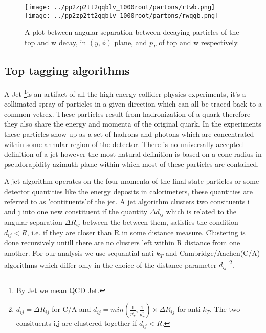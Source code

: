 \documentclass[12pt,a4paper]{article}		%
\begin{document}
\newpage
 	\begin{figure}[h]
 		\begin{centering}	
 			\texttt{[image: ../pp2zp2tt2qqblv\_1000root/partons/rtwb.png]} 
 			\texttt{[image: ../pp2zp2tt2qqblv\_1000root/partons/rwqqb.png]}
 			\caption{A plot between angular separation between decaying particles of the top and w decay, in $(y,\phi)$ plane, and $p_T$ of top and w respectively.}
 			\label{rwbt}
 			\centering
 		\end{centering} 		
 	\end{figure}   
 
 
\subsection{Top tagging algorithms}

	A Jet \footnote{By Jet we mean QCD Jet.}is an artifact of all the high energy collider physics experiments, it's a collimated spray of particles in a given direction which can all be traced back to a common vetrex. These particles result from hadronization of a quark therefore they also share the energy and momenta of the original quark. In the experiments these particles show up as a set of hadrons and photons which are concentrated within some annular region of the detector. There is no universally accepted definition of a jet however the most natural definition is based on a cone radius in pseudorapidity-azimuth plane within which most of these particles are contained. 
	
	A jet algorithm operates on the four momenta of the final state particles or some detector quantities like the energy deposits in calorimeters, these quantities are referred to as 'contituents'of the jet. A jet algorithm clusters two consituents i and j into one new constituent if the quantity $\Delta d_{ij}$ which is related to the angular separation $\Delta R_{ij}$ between the  between them, satisfies the condition $d_{ij} < R$, i.e. if they are closer than R in some distance measure. Clustering is done recursively untill there are no clusters left within R distance from one another. For our analysis we use sequantial anti-$k_T$ and Cambridge/Aachen(C/A) algorithms which differ only in the choice of the distance parameter $d_{ij}$ \footnote{ $d_{ij} = \Delta R_{ij}$ for C/A and $d_{ij} = min \left( \frac{1}{p_T^i}, \frac{1}{p_T^j} \right)\times \Delta R_{ij}  $ for anti-$k_T$. The two consituents i,j are clustered together if $d_{ij} < R$.}.  
	
\end{document}
